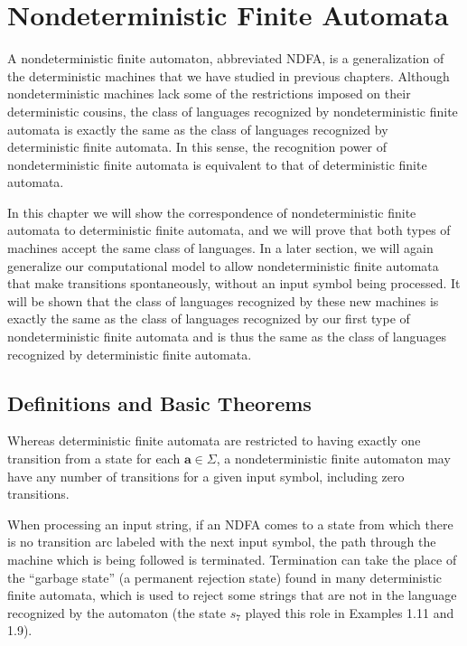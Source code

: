 \chapter{Nondeterministic Finite Automata}\label{ch-4}

A nondeterministic finite automaton, abbreviated NDFA, is a
generalization of the deterministic machines that we have studied
in previous chapters. Although nondeterministic machines lack some
of the restrictions imposed on their deterministic cousins, the
class of languages recognized by nondeterministic finite automata
is exactly the same as the class of languages recognized by
deterministic finite automata.  In this sense, the recognition power
of nondeterministic finite automata is equivalent to that of
deterministic finite automata.

In this chapter we will show the correspondence of nondeterministic
finite automata to deterministic finite automata, and we will prove
that both types of machines accept the same class of languages. In
a later section, we will again generalize our computational model
to allow nondeterministic finite automata that make transitions
spontaneously, without an input symbol being processed. It will be
shown that the class of languages recognized by these new machines
is exactly the same as the class of languages recognized by our
first type of nondeterministic finite automata and is thus the same
as the class of languages recognized by deterministic finite automata.

\section{Definitions and Basic Theorems}\label{sec-4.1}

Whereas deterministic finite automata are restricted to having
exactly one transition from a state for each $\mathbf{a} \in \Sigma$, a
nondeterministic finite automaton may have any number of transitions
for a given input symbol, including zero transitions.

When processing an input string, if an NDFA comes to a state from
which there is no transition arc labeled with the next input symbol,
the path through the machine which is being followed is terminated.
Termination can take the place of the ``garbage state'' (a permanent
rejection state) found in many deterministic finite automata, which
is used to reject some strings that are not in the language recognized
by the automaton (the state $s_7$ played this role in Examples 1.11 and
1.9).

